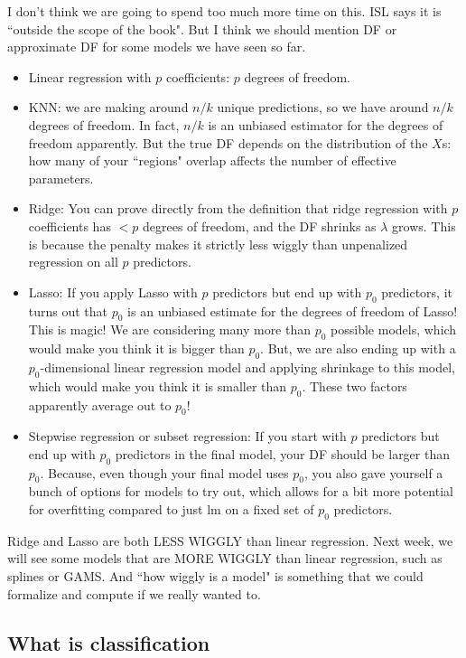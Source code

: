 I don't think we are going to spend too much more time on this. ISL says it is ``outside the scope of the book". But I think we should mention DF or approximate DF for some models we have seen so far. 
\begin{itemize}
\item Linear regression with $p$ coefficients: $p$ degrees of freedom. 
\item KNN: we are making around $n/k$ unique predictions, so we have around $n/k$ degrees of freedom. In fact, $n/k$ is an unbiased estimator for the degrees of freedom apparently. But the true DF depends on the distribution of the $X$s: how many of your ``regions" overlap affects the number of effective parameters. 
\item Ridge: You can prove directly from the definition that ridge regression with $p$ coefficients has $< p$ degrees of freedom, and the DF shrinks as $\lambda$ grows. This is because the penalty makes it strictly less wiggly than unpenalized regression on all $p$ predictors. 
\item Lasso: If you apply Lasso with $p$ predictors but end up with $p_0$ predictors, it turns out that $p_0$ is an unbiased estimate for the degrees of freedom of Lasso! This is magic! We are considering many more than $p_0$ possible models, which would make you think it is bigger than $p_0$. But, we are also ending up with a $p_0$-dimensional linear regression model and applying shrinkage to this model, which would make you think it is smaller than $p_0$. These two factors apparently average out to $p_0$! 
\item Stepwise regression or subset regression: If you start with $p$ predictors but end up with $p_0$ predictors in the final model, your DF should be larger than $p_0$. Because, even though your final model uses $p_0$, you also gave yourself a bunch of options for models to try out, which allows for a bit more potential for overfitting compared to just lm on a fixed set of $p_0$ predictors. 
\end{itemize}

Ridge and Lasso are both LESS WIGGLY than linear regression. Next week, we will see some models that are MORE WIGGLY than linear regression, such as splines or GAMS. And ``how wiggly is a model" is something that we could formalize and compute if we really wanted to. 

\subsection{What is classification}


